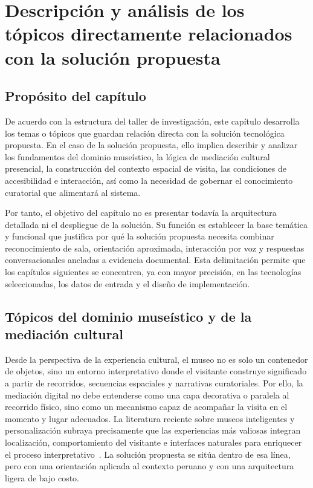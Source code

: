 \chapter{Descripci\'on y an\'alisis de los t\'opicos directamente relacionados con la solución propuesta}

\section{Prop\'osito del cap\'itulo}

De acuerdo con la estructura del taller de investigaci\'on, este cap\'itulo desarrolla los temas o t\'opicos que guardan relaci\'on directa con la soluci\'on tecnol\'ogica propuesta. En el caso de la solución propuesta, ello implica describir y analizar los fundamentos del dominio muse\'istico, la l\'ogica de mediaci\'on cultural presencial, la construcci\'on del contexto espacial de visita, las condiciones de accesibilidad e interacci\'on, as\'i como la necesidad de gobernar el conocimiento curatorial que alimentar\'a al sistema.

Por tanto, el objetivo del cap\'itulo no es presentar todav\'ia la arquitectura detallada ni el despliegue de la soluci\'on. Su funci\'on es establecer la base tem\'atica y funcional que justifica por qu\'e la solución propuesta necesita combinar reconocimiento de sala, orientaci\'on aproximada, interacci\'on por voz y respuestas conversacionales ancladas a evidencia documental. Esta delimitaci\'on permite que los cap\'itulos siguientes se concentren, ya con mayor precisi\'on, en las tecnolog\'ias seleccionadas, los datos de entrada y el dise\~no de implementaci\'on.

\section{T\'opicos del dominio muse\'istico y de la mediaci\'on cultural}

Desde la perspectiva de la experiencia cultural, el museo no es solo un contenedor de objetos, sino un entorno interpretativo donde el visitante construye significado a partir de recorridos, secuencias espaciales y narrativas curatoriales. Por ello, la mediaci\'on digital no debe entenderse como una capa decorativa o paralela al recorrido f\'isico, sino como un mecanismo capaz de acompa\~nar la visita en el momento y lugar adecuados. La literatura reciente sobre museos inteligentes y personalizaci\'on subraya precisamente que las experiencias m\'as valiosas integran localizaci\'on, comportamiento del visitante e interfaces naturales para enriquecer el proceso interpretativo~\cite{ivanov2025smartmuseums}. La solución propuesta se sit\'ua dentro de esa l\'inea, pero con una orientaci\'on aplicada al contexto peruano y con una arquitectura ligera de bajo costo.

